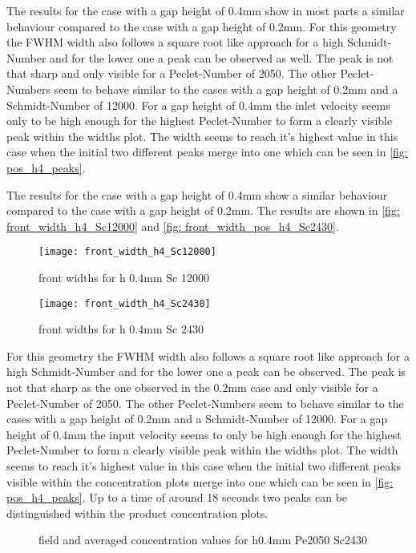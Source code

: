 \documentclass[../thesis.tex]{subfiles}
\begin{document}
The results for the case with a gap height of 0.4mm show in most parts a similar behaviour compared to the case with a gap height of 0.2mm. For this geometry the FWHM width also follows a square root like approach for a high Schmidt-Number and for the lower one a peak can be observed as well. The peak is not that sharp and only visible for a Peclet-Number of 2050. The other Peclet-Numbers seem to behave similar to the cases with a gap height of 0.2mm and a Schmidt-Number of 12000. For a gap height of 0.4mm the inlet velocity seems only to be high enough for the highest Peclet-Number to form a clearly visible peak within the widths plot. The width seems to reach it's highest value in this case when the initial two different peaks merge into one which can be seen in \autoref{fig: pos_h4_peaks}.

The results for the case with a gap height of 0.4mm show a similar behaviour compared to the case with a gap height of 0.2mm. The results are shown in \autoref{fig: front_width_h4_Sc12000} and \autoref{fig: front_width_pos_h4_Sc2430}.
\begin{figure}[htbp]
	\centering
	\texttt{[image: front\_width\_h4\_Sc12000]}
	\caption{front widths for h 0.4mm Sc 12000\label{fig: front_width_h4_Sc12000}}\bigskip
	\texttt{[image: front\_width\_h4\_Sc2430]}
	\caption{front widths for h 0.4mm Sc 2430\label{fig: front_width_pos_h4_Sc2430}}
\end{figure}
 For this geometry the FWHM width also follows a square root like approach for a high Schmidt-Number and for the lower one a peak can be observed. The peak is not that sharp as the one observed in the 0.2mm case and only visible for a Peclet-Number of 2050. The other Peclet-Numbers seem to behave similar to the cases with a gap height of 0.2mm and a Schmidt-Number of 12000. For a gap height of 0.4mm the input velocity seems to only be high enough for the highest Peclet-Number to form a clearly visible peak within the widths plot. The width seems to reach it's highest value in this case when the initial two different peaks visible within the concentration plots merge into one which can be seen in \autoref{fig: pos_h4_peaks}. Up to a time of around 18 seconds two peaks can be distinguished within the product concentration plots. 
\begin{figure}[htb]
	\centering
	\qquad
	\caption{field and averaged concentration values for h0.4mm Pe2050 Sc2430}%
	\label{fig: pos_h4_peaks}%
\end{figure}
\end{document}
